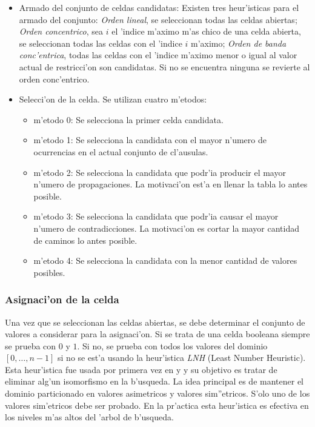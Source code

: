 \begin{itemize}

\item{Armado del conjunto de celdas candidatas}: Existen tres heur'isticas para el armado del conjunto: \textit{Orden lineal}, se seleccionan todas las celdas abiertas; \textit{Orden concentrico}, sea $i$ el 'indice m'aximo m'as chico  de una celda abierta, se seleccionan todas las celdas con el 'indice $i$ m'aximo; \textit{Orden de banda conc'entrica}, todas las celdas con el 'indice m'aximo menor o igual al valor actual de restricci'on son candidatas. Si no se encuentra ninguna se revierte al orden conc'entrico.

\item{Selecci'on de la celda}. Se utilizan cuatro m'etodos:

\begin{itemize}
\item{m'etodo 0}: Se selecciona la primer celda candidata.
\item{m'etodo 1}: Se selecciona la candidata con el mayor n'umero de ocurrencias en el actual conjunto de cl'ausulas.
\item{m'etodo 2}: Se selecciona la candidata que podr'ia producir el mayor n'umero de propagaciones. La motivaci'on est'a en llenar la tabla lo antes posible.
\item{m'etodo 3}: Se selecciona la candidata que podr'ia causar el mayor n'umero de contradicciones. La motivaci'on es cortar la mayor cantidad de caminos lo antes posible.
\item{m'etodo 4}: Se selecciona la candidata con la menor cantidad de valores posibles.
\end{itemize}

\end{itemize}


\subsubsection{Asignaci'on de la celda}
Una vez que se seleccionan las celdas abiertas, se debe determinar el conjunto de valores a considerar para la asignaci'on. Si se trata de una celda booleana siempre se prueba con $0$ y $1$. Si no, se prueba con todos los valores del dominio $[0,\dots,n-1]$ si no se est'a usando la heur'istica \textit{LNH} (Least Number Heuristic). Esta heur'istica fue usada por primera vez en \cite{zhang95} y \cite{zhang96} y su objetivo es tratar de eliminar alg'un isomorfismo en la b'usqueda. La idea principal es de mantener el dominio particionado en valores asimetricos y valores sim''etricos. S'olo uno de los valores sim'etricos debe ser probado. En la pr'actica esta heur'istica es efectiva en los niveles m'as altos del 'arbol de b'usqueda.


